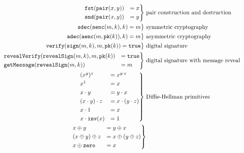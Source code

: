 \begin{figure}
    \begin{align*}
        \begin{rcases}
            \texttt{fst}(\texttt{pair}(x,y)) &= x\\
            \texttt{snd}(\texttt{pair}(x,y)) &= y
        \end{rcases} \ &\text{pair construction and destruction}\\
        \begin{rcases}
            \texttt{sdec}(\texttt{senc}(m, k), k) = m
        \end{rcases} \ &\text{symmetric cryptography}\\
        \begin{rcases}
            \texttt{adec}(\texttt{aenc}(m, \texttt{pk}(k)), k) = m
        \end{rcases} \ &\text{asymmetric cryptography}\\
        \begin{rcases}
            \texttt{verify}(\texttt{sign}(m,k),m,\texttt{pk}(k)) = \texttt{true}
        \end{rcases} \ &\text{digital signature}\\
        \begin{rcases}
            \texttt{revealVerify}(\texttt{revealSign}(m,k),m,\texttt{pk}(k)) &= \texttt{true}\\
            \texttt{getMessage}(\texttt{revealSign}(m,k)) &= m
        \end{rcases} \ &\text{digital signature with message reveal}\\
        \begin{rcases}
            (x^y)^z &= x^{y \cdot z}\\
            x^1 &= x\\
            x \cdot y &= y \cdot x\\
            (x \cdot y) \cdot z &= x \cdot (y \cdot z)\\
            x \cdot 1 &= x\\
            x \cdot \texttt{inv}(x) &= 1
        \end{rcases} \ &\text{Diffie-Hellman primitives}\\
        \begin{rcases}
            x \oplus y &= y \oplus x\\
            (x \oplus y) \oplus z &= x \oplus (y \oplus z)\\
            x \oplus \texttt{zero} &= x\\

\end{rcases}
\end{align*}
\end{figure}

